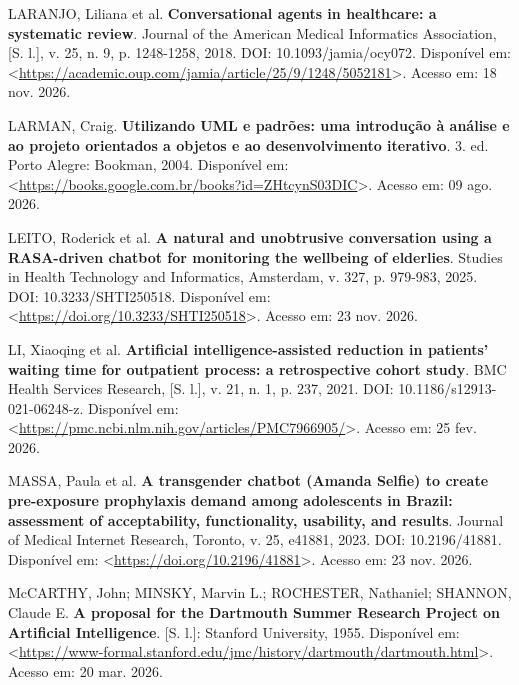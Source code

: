 \documentclass[12pt,a4paper]{extarticle}
\begin{document}
\vspace{0.5cm}\noindent
LARANJO, Liliana et al. \textbf{Conversational agents in healthcare: a systematic review}. Journal of the American Medical Informatics Association, [S. l.], v. 25, n. 9, p. 1248-1258, 2018. DOI: 10.1093/jamia/ocy072. Disponível em: <\url{https://academic.oup.com/jamia/article/25/9/1248/5052181}>. Acesso em: 18 nov. 2026.

\vspace{0.5cm}\noindent
LARMAN, Craig. \textbf{Utilizando UML e padrões: uma introdução à análise e ao projeto orientados a objetos e ao desenvolvimento iterativo}. 3. ed. Porto Alegre: Bookman, 2004. Disponível em: <\url{https://books.google.com.br/books?id=ZHtcynS03DIC}>. Acesso em: 09 ago. 2026.

\vspace{0.5cm}\noindent
LEITO, Roderick et al. \textbf{A natural and unobtrusive conversation using a RASA-driven chatbot for monitoring the wellbeing of elderlies}. Studies in Health Technology and Informatics, Amsterdam, v. 327, p. 979-983, 2025. DOI: 10.3233/SHTI250518. Disponível em: <\url{https://doi.org/10.3233/SHTI250518}>. Acesso em: 23 nov. 2026.

\vspace{0.5cm}\noindent
LI, Xiaoqing et al. \textbf{Artificial intelligence-assisted reduction in patients' waiting time for outpatient process: a retrospective cohort study}. BMC Health Services Research, [S. l.], v. 21, n. 1, p. 237, 2021. DOI: 10.1186/s12913-021-06248-z. Disponível em: <\url{https://pmc.ncbi.nlm.nih.gov/articles/PMC7966905/}>. Acesso em: 25 fev. 2026.

\vspace{0.5cm}\noindent
MASSA, Paula et al. \textbf{A transgender chatbot (Amanda Selfie) to create pre-exposure prophylaxis demand among adolescents in Brazil: assessment of acceptability, functionality, usability, and results}. Journal of Medical Internet Research, Toronto, v. 25, e41881, 2023. DOI: 10.2196/41881. Disponível em: <\url{https://doi.org/10.2196/41881}>. Acesso em: 23 nov. 2026.

\vspace{0.5cm}\noindent
McCARTHY, John; MINSKY, Marvin L.; ROCHESTER, Nathaniel; SHANNON, Claude E. \textbf{A proposal for the Dartmouth Summer Research Project on Artificial Intelligence}. [S. l.]: Stanford University, 1955. Disponível em: <\url{https://www-formal.stanford.edu/jmc/history/dartmouth/dartmouth.html}>. Acesso em: 20 mar. 2026.
\end{document}

